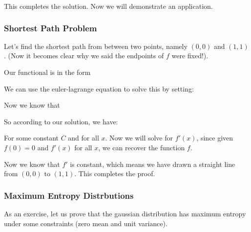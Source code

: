 \documentclass[12pt]{article}
\begin{document}
This completes the solution. Now we will demonstrate an application.

\subsubsection{Shortest Path Problem}

Let's find the shortest path from between two points, namely $(0,0)$ and $(1,1)$. (Now it becomes clear why we said the endpoints of $f$ were fixed!).

Our functional is in the form


We can use the euler-lagrange equation to solve this by setting:


Now we know that

So according to our solution, we have:

For some constant $C$ and for all $x$. Now we will solve for $f'(x)$, since given $f(0) = 0$ and $f'(x)$ for all $x$, we can recover the function $f$.


Now we know that $f'$ is constant, which means we have drawn a straight line from $(0,0)$ to $(1,1)$. This completes the proof.

\subsubsection{Maximum Entropy Distrbutions}

As an exercise, let us prove that the gaussian distribution has maximum entropy under some constraints (zero mean and unit variance). 
\end{document}

